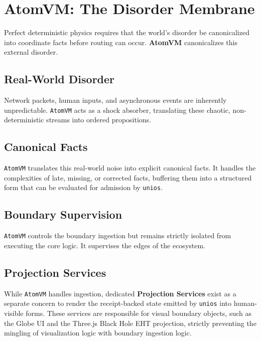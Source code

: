 \chapter{AtomVM: The Disorder Membrane}

Perfect deterministic physics requires that the world's disorder be canonicalized into coordinate facts before routing can occur. \textbf{AtomVM} canonicalizes this external disorder.

\section{Real-World Disorder}

Network packets, human inputs, and asynchronous events are inherently unpredictable. \texttt{AtomVM} acts as a shock absorber, translating these chaotic, non-deterministic streams into ordered propositions. 

\section{Canonical Facts}

\texttt{AtomVM} translates this real-world noise into explicit canonical facts. It handles the complexities of late, missing, or corrected facts, buffering them into a structured form that can be evaluated for admission by \texttt{unios}.

\section{Boundary Supervision}

\texttt{AtomVM} controls the boundary ingestion but remains strictly isolated from executing the core logic. It supervises the edges of the ecosystem.

\section{Projection Services}

While \texttt{AtomVM} handles ingestion, dedicated \textbf{Projection Services} exist as a separate concern to render the receipt-backed state emitted by \texttt{unios} into human-visible forms. These services are responsible for visual boundary objects, such as the Globe UI and the Three.js Black Hole EHT projection, strictly preventing the mingling of visualization logic with boundary ingestion logic.